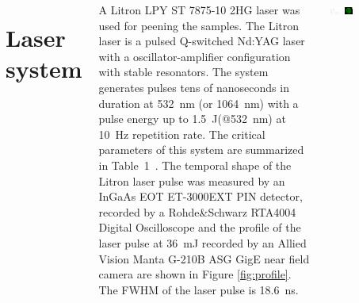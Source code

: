 \documentclass[20pt,margin=1in,innermargin=-4.5in,blockverticalspace=-0.25in]{tikzposter}
\begin{document}
\begin{columns}
{    %

    \section*{Laser system}
    A Litron LPY ST 7875-10 2HG laser was used for peening the samples. The Litron laser is a pulsed Q-switched Nd:YAG laser with a oscillator-amplifier configuration with stable resonators. The system generates pulses tens of nanoseconds in duration at \SI{532}{\nano\meter} (or \SI{1064}{\nano\meter}) with a pulse energy up to \SI{1.5}{\joule }(@\SI{532}{\nano\meter}) at \SI{10}{\hertz} repetition rate. The critical parameters of this system are summarized in Table~1~\cite{litron}. The temporal shape of the Litron laser pulse was measured by an InGaAs EOT ET-3000EXT PIN detector, recorded by a Rohde\&Schwarz RTA4004 Digital Oscilloscope and the profile of the laser pulse at \SI{36}{\milli\joule} recorded by an Allied Vision Manta G-210B ASG GigE near field camera are shown in Figure \ref{fig:profile}. 
    The FWHM of the laser pulse is \SI{18.6}{\ns}.



        \begin{center}
        \begin{tikzfigure} 
        \includegraphics[width=0.15\textwidth,valign=c]{img/temporal_profile_new.png}
        \label{fig:profile}
        \includegraphics[width=0.10\textwidth,valign=c]{img/C2-v3_36_mJ_scale.png}
        \label{fig:profile}
        \end{tikzfigure}
        \end{center}


}
\end{columns}
\end{document}
